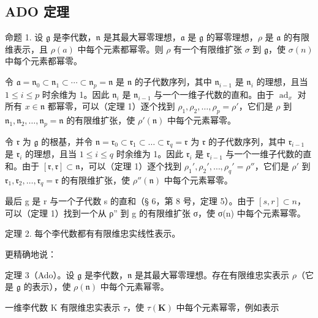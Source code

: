 \subsection{ADO 定理}

命题 1. 设 \(\mathfrak{g}\) 是李代数，\(\mathfrak{n}\) 是其最大幂零理想，\(\mathfrak{a}\) 是 \(\mathfrak{g}\) 的幂零理想，\(\rho\) 是 \(\mathfrak{a}\) 的有限维表示，且 \(\rho(a)\) 中每个元素都幂零。则 \(\rho\) 有一个有限维扩张 \(\sigma\) 到 \(\mathfrak{g}\)，使 \(\sigma(n)\) 中每个元素都幂零。

令 \(\mathfrak{a} = \mathfrak{n}_0 \subset \mathfrak{n}_1 \subset \cdots \subset \mathfrak{n}_p = \mathfrak{n}\) 是 \(\mathfrak{n}\) 的子代数序列，其中 \(\mathfrak{n}_{i-1}\) 是 \(\mathfrak{n}_i\) 的理想，且当 \(1 \leqslant i \leqslant p\) 时余维为 1。因此 \(\mathfrak{n}_i\) 是 \(\mathfrak{n}_{i-1}\) 与一个一维子代数的直和。由于 \(\operatorname{ad}_x\) 对所有 \(x \in \mathfrak{n}\) 都幂零，可以（定理 1）逐个找到 \(\rho_1, \rho_2, \ldots, \rho_p = \rho'\)，它们是 \(\rho\) 到 \(\mathfrak{n}_1, \mathfrak{n}_2, \ldots, \mathfrak{n}_p = \mathfrak{n}\) 的有限维扩张，使 \(\rho'(\mathfrak{n})\) 中每个元素幂零。

令 \(\mathfrak{r}\) 为 \(\mathfrak{g}\) 的根基，并令 \(\mathfrak{n} = \mathfrak{r}_0 \subset \mathfrak{r}_1 \subset \dots \subset \mathfrak{r}_q = \mathfrak{r}\) 为 \(\mathfrak{r}\) 的子代数序列，其中 \(\mathfrak{r}_{i-1}\) 是 \(\mathfrak{r}_i\) 的理想，且当 \(1 \leqslant i \leqslant q\) 时余维为 1。因此 \(\mathfrak{r}_i\) 是 \(\mathfrak{r}_{i-1}\) 与一个一维子代数的直和。由于 \([\mathfrak{r}, \mathfrak{r}] \subset \mathfrak{n}\)，可以（定理 1）逐个找到 \(\rho_1', \rho_2', \ldots, \rho_q' = \rho''\)，它们是 \(\rho'\) 到 \(\mathfrak{r}_1, \mathfrak{r}_2, \ldots, \mathfrak{r}_q = \mathfrak{r}\) 的有限维扩张，使 \(\rho''(\mathfrak{n})\) 中每个元素幂零。

最后 g 是 r 与一个子代数 s 的直和（§ 6，第 8 号，定理 5）。由于 \([s, r] \subset n\)，可以（定理 1）找到一个从 ρ'' 到 g 的有限维扩张 σ，使 σ(n) 中每个元素幂零。

定理 2. 每个李代数都有有限维忠实线性表示。

更精确地说：

定理 3（Ado）。设 \(\mathfrak{g}\) 是李代数，\(\mathfrak{n}\) 是其最大幂零理想。存在有限维忠实表示 \(\rho\)（它是 \(\mathfrak{g}\) 的表示），使 \(\rho(\mathfrak{n})\) 中每个元素幂零。

一维李代数 K 有限维忠实表示 \(\tau\)，使 \(\tau(\mathbf{K})\) 中每个元素幂零，例如表示

